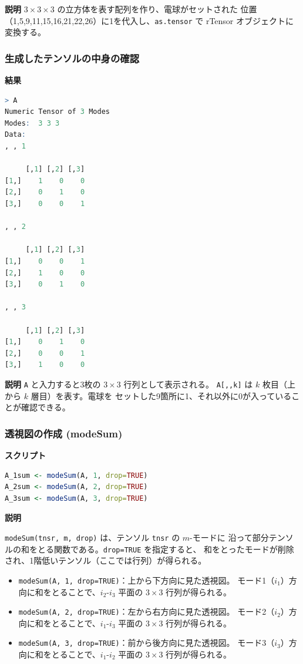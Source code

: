 \documentclass[12pt,a4paper]{ltjsarticle}
\begin{document}
\textbf{説明}
$3\times3\times3$ の立方体を表す配列を作り、電球がセットされた
位置（1,5,9,11,15,16,21,22,26）に1を代入し、\texttt{as.tensor} で
rTensor オブジェクトに変換する。

\subsubsection{生成したテンソルの中身の確認}

\textbf{結果}
\begin{lstlisting}[language=R]
> A
Numeric Tensor of 3 Modes
Modes:  3 3 3
Data:
, , 1

     [,1] [,2] [,3]
[1,]    1    0    0
[2,]    0    1    0
[3,]    0    0    1

, , 2

     [,1] [,2] [,3]
[1,]    0    0    1
[2,]    1    0    0
[3,]    0    1    0

, , 3

     [,1] [,2] [,3]
[1,]    0    1    0
[2,]    0    0    1
[3,]    1    0    0
\end{lstlisting}

\textbf{説明}
\texttt{A} と入力すると3枚の $3\times3$ 行列として表示される。
\texttt{A[,,k]} は $k$ 枚目（上から $k$ 層目）を表す。電球を
セットした9箇所に1、それ以外に0が入っていることが確認できる。

\subsubsection{透視図の作成 (modeSum)}

\textbf{スクリプト}

\begin{lstlisting}[language=R]
A_1sum <- modeSum(A, 1, drop=TRUE)
A_2sum <- modeSum(A, 2, drop=TRUE)
A_3sum <- modeSum(A, 3, drop=TRUE)
\end{lstlisting}

\textbf{説明}

\texttt{modeSum(tnsr, m, drop)} は、テンソル \texttt{tnsr} の $m$-モードに
沿って部分テンソルの和をとる関数である。\texttt{drop=TRUE} を指定すると、
和をとったモードが削除され、1階低いテンソル（ここでは行列）が得られる。

\begin{itemize}
  \item \texttt{modeSum(A, 1, drop=TRUE)}：上から下方向に見た透視図。
    モード1（$i_1$）方向に和をとることで、$i_2$-$i_3$ 平面の $3 \times 3$ 行列が得られる。
  \item \texttt{modeSum(A, 2, drop=TRUE)}：左から右方向に見た透視図。
    モード2（$i_2$）方向に和をとることで、$i_1$-$i_3$ 平面の $3 \times 3$ 行列が得られる。
  \item \texttt{modeSum(A, 3, drop=TRUE)}：前から後方向に見た透視図。
    モード3（$i_3$）方向に和をとることで、$i_1$-$i_2$ 平面の $3 \times 3$ 行列が得られる。
\end{itemize}
\end{document}
